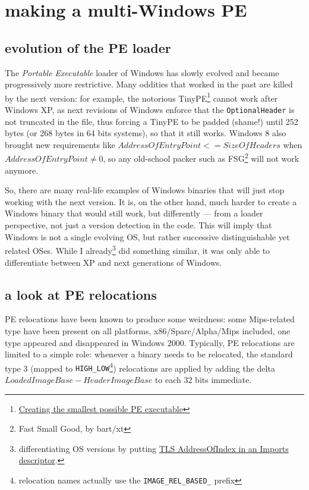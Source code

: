 \documentclass{article}
\begin{document}
\section{making a multi-Windows PE}
\subsection{evolution of the PE loader}
The {\em Portable Executable} loader of Windows has slowly evolved and became progressively more restrictive. Many oddities that worked in the past are killed by the next version: for example, the notorious TinyPE\footnote{\href{http://www.phreedom.org/research/tinype/}{Creating the smallest possible PE executable}} cannot work after Windows XP, as next revisions of Windows enforce that the {\tt OptionalHeader} is not truncated in the file, thus forcing a TinyPE to be padded (shame!) until 252 bytes (or 268 bytes in 64 bits systems), so that it still works. Windows 8 also brought new requirements like $AddressOfEntryPoint <= SizeOfHeaders $ when $ AddressOfEntryPoint \neq 0$, so any old-school packer such as FSG\footnote{Fast Small Good, by bart/xt} will not work anymore.

So, there are many real-life examples of Windows binaries that will just stop working with the next version. It is, on the other hand, much harder to create a Windows binary that would still work, but differently --- from a loader perspective, not just a version detection in the code. This will imply that Windows is not a single evolving OS, but rather successive distinguishable yet related OSes. While I already\footnote{differentiating OS versions by putting  \href{https://corkami.googlecode.com/svn-history/r889/trunk/asm/PE/tls_aoiOSDET.asm}{TLS AddressOfIndex in an Imports descriptor}.} did something similar, it was only able to differentiate between XP and next generations of Windows.

\subsection{a look at PE relocations}
PE relocations have been known to produce some weirdness: some Mips-related type have been present on all platforms, x86/Sparc/Alpha/Mips included, one type appeared and disappeared in Windows 2000. Typically, PE relocations are limited to a simple role: whenever a binary needs to be relocated, the standard type 3 (mapped to {\tt HIGH\_LOW}\footnote{relocation names actually use the {\tt IMAGE\_REL\_BASED\_} prefix}) relocations are applied by adding the delta $LoadedImageBase - HeaderImageBase$ to each 32 bits immediate.
\end{document}
